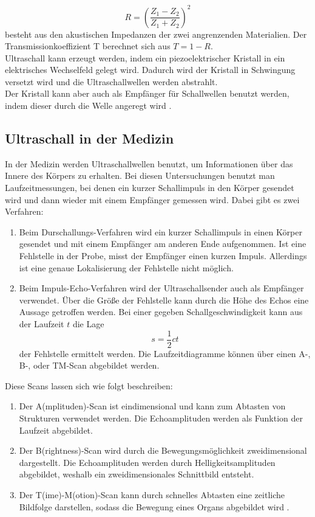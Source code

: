 \begin{equation*}
  R=\left(\frac{Z_1-Z_2}{Z_1+Z_2}\right)^2
\end{equation*}
besteht aus den akustischen Impedanzen der zwei angrenzenden Materialien. Der Transmissionkoeffizient T berechnet sich aus $T=1-R$.\\
Ultraschall kann erzeugt werden, indem ein piezoelektrischer Kristall in ein elektrisches Wechselfeld gelegt wird. Dadurch wird der Kristall in Schwingung versetzt wird und die Ultraschallwellen werden abstrahlt. \\
Der Kristall kann aber auch als Empfänger für Schallwellen benutzt werden, indem dieser durch die Welle angeregt wird \cite{1}.

\subsection{Ultraschall in der Medizin}
In der Medizin werden Ultraschallwellen benutzt, um Informationen über das Innere des Körpers zu erhalten. Bei diesen Untersuchungen benutzt man Laufzeitmessungen, bei denen ein kurzer Schallimpuls in den Körper gesendet wird und dann wieder mit einem Empfänger gemessen wird. Dabei gibt es zwei Verfahren:\\
\begin{enumerate}[nosep,label=\textsc{\arabic*},leftmargin=*]
\item Beim Durschallungs-Verfahren wird ein kurzer Schallimpuls in einen Körper gesendet und mit einem Empfänger am anderen Ende aufgenommen. Ist eine Fehlstelle in der Probe, misst der Empfänger einen kurzen Impuls. Allerdings ist eine genaue Lokalisierung der Fehlstelle nicht möglich.
\item Beim Impuls-Echo-Verfahren wird der Ultraschallsender auch als Empfänger verwendet. Über die Größe der Fehlstelle kann durch die Höhe des Echos  eine Aussage getroffen werden. Bei einer gegeben Schallgeschwindigkeit kann aus der Laufzeit $t$ die Lage
\begin{equation*}
  s=\frac{1}{2}ct
\end{equation*}
der Fehlstelle ermittelt werden. Die Laufzeitdiagramme können über einen A-, B-, oder TM-Scan abgebildet werden.
\end{enumerate}
Diese Scans lassen sich wie folgt beschreiben:
\begin{enumerate}[nosep,label=\textsc{\arabic*},leftmargin=*]
\item Der A(mplituden)-Scan ist eindimensional und kann zum Abtasten von Strukturen verwendet werden. Die Echoamplituden werden als Funktion der Laufzeit abgebildet.
\item Der B(rightness)-Scan wird durch die Bewegungsmöglichkeit zweidimensional dargestellt. Die Echoamplituden werden durch Helligkeitsamplituden abgebildet, weshalb ein zweidimensionales Schnittbild entsteht. 
\item Der T(ime)-M(otion)-Scan kann durch schnelles Abtasten eine zeitliche Bildfolge darstellen, sodass die Bewegung eines Organs abgebildet wird \cite{1}. 
\end{enumerate}
